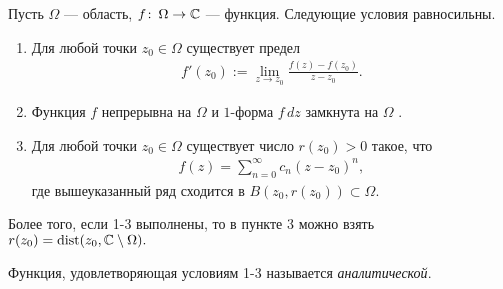 \begin{thm}
 Пусть $\Omega$  --- область, $f\colon\,\Omega \to \mathbb{C}$  --- функция. Следующие условия равносильны.
 \begin{enumerate}
  \item \label{enum1:theorem:cauchy_gurs_morer} Для любой точки $z_0 \in \Omega$ существует предел
   \begin{align*}
    f'(z_0) := \lim_{z \to z_0} \frac{f(z) - f(z_0)}{z-z_0}.
   \end{align*} 
  \item Функция $f$ непрерывна на $\Omega$ и $1$-форма $f\,dz$  замкнута на $\Omega$ .
  \item Для любой точки $ z_0 \in \Omega$ существует число $r(z_0) > 0$ такое, что
    \begin{align*}
    f(z) = \sum_{n=0}^{\infty} c_n(z-z_0)^{n},
   \end{align*} где вышеуказанный ряд сходится в $B(z_0, r(z_0)) \subset \Omega$.
 \end{enumerate}
 Более того,  если 1-3 выполнены, то в пункте 3 можно взять $r(z_0) = \mathrm{dist}(z_0, \mathbb{C} \setminus \Omega).$
\end{thm}
\begin{df}
 Функция, удовлетворяющая условиям 1-3 называется \textit{аналитической}.
\end{df}
